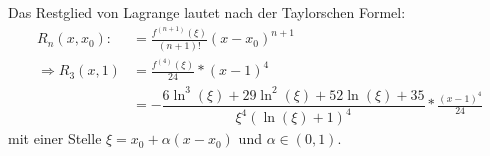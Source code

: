 \documentclass[a4paper]{article}
\begin{document}
Das Restglied von Lagrange lautet nach der Taylorschen Formel:
\begin{align*}
	R_n(x,x_0) :	&= \frac{f^{(n+1)}(\xi)}{(n + 1)!} (x - x_0)^{n+1} \\
	\Rightarrow R_3(x,1) &= \frac{f^{(4)}(\xi)}{24} * (x-1)^4  \\
	&= -\dfrac{6\ln^3\left(\xi\right)+29\ln^2\left(\xi\right)+52\ln\left(\xi\right)+35}{\xi^4\left(\ln\left(\xi\right)+1\right)^4} * \frac{(x-1)^4}{24}
\end{align*}
mit einer Stelle $\xi = x_0 + \alpha(x-x_0)$ und $\alpha \in (0,1)$.
\end{document}
